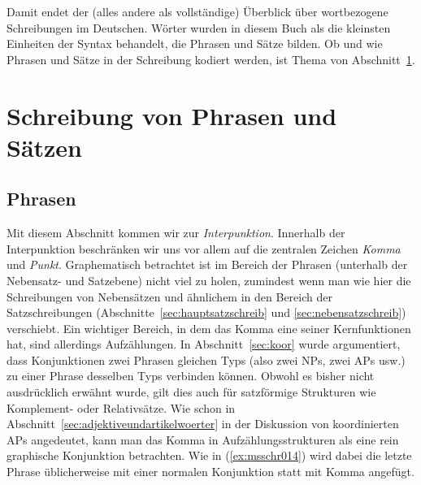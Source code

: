 Damit endet der (alles andere als vollständige) Überblick über wortbezogene Schreibungen im Deutschen.
Wörter wurden in diesem Buch als die kleinsten Einheiten der Syntax behandelt, die Phrasen und Sätze bilden.
Ob und wie Phrasen und Sätze in der Schreibung kodiert werden, ist Thema von Abschnitt~\ref{sec:satzschreib}.




\section{Schreibung von Phrasen und Sätzen}

\label{sec:satzschreib}

\subsection{Phrasen}

\label{sec:phrasenschrift}
\label{sec:koordinschreib}

Mit diesem Abschnitt kommen wir zur \textit{Interpunktion}.
Innerhalb der Interpunktion beschränken wir uns vor allem auf die zentralen Zeichen \textit{Komma} und \textit{Punkt}.
Graphematisch betrachtet ist im Bereich der Phrasen (unterhalb der Nebensatz- und Satzebene) nicht viel zu holen, zumindest wenn man wie hier die Schreibungen von Nebensätzen und ähnlichem in den Bereich der Satzschreibungen (Abschnitte~\ref{sec:hauptsatzschreib} und \ref{sec:nebensatzschreib}) verschiebt.
Ein wichtiger Bereich, in dem das Komma eine seiner Kernfunktionen hat, sind allerdings Aufzählungen.
In Abschnitt~\ref{sec:koor} wurde argumentiert, dass Konjunktionen zwei Phrasen gleichen Typs (also zwei NPs, zwei APs usw.) zu einer Phrase desselben Typs verbinden können.
Obwohl es bisher nicht ausdrücklich erwähnt wurde, gilt dies auch für satzförmige Strukturen wie Komplement- oder Relativsätze.
Wie schon in Abschnitt~\ref{sec:adjektiveundartikelwoerter} in der Diskussion von koordinierten APs angedeutet, kann man das Komma in Aufzählungsstrukturen als eine rein graphische Konjunktion betrachten.
Wie in (\ref{ex:msschr014}) wird dabei die letzte Phrase üblicherweise mit einer normalen Konjunktion statt mit Komma angefügt.


